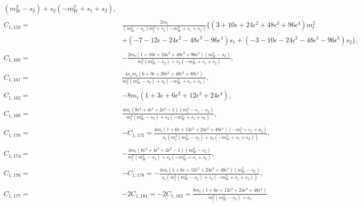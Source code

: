 \documentclass[twocolumn,aps,showpacs,nofootinbib,superscriptaddress,prd]{revtex4-2}
\begin{document}
\begin{widetext}
\begin{align}
{\left(m_W^2-s_2\right)+s_2\left(-m_W^2+s_1+s_2\right)}
,\nonumber\\
\nonumber\\
C_{1,159}=&\frac{2m_t}{\left(m_W^2-s_2\right)m_t^2+s_2\left(-m_W^2+s_1+s_2\right)}\{\left(3 +10 \epsilon +24 \epsilon^2 +48 \epsilon^3 +96 \epsilon^4\right)m_t^2
\nonumber\\&
+\left(-7 -12 \epsilon -24 \epsilon^2 -48 \epsilon^3 -96 \epsilon^4\right)s_1+\left(-3 -10 \epsilon -24 \epsilon^2 -48 \epsilon^3 -96 \epsilon^4\right)s_2\}
,\nonumber\\
\nonumber\\
C_{1,160}=&-\frac{2m_t\left(1 +10 \epsilon +24 \epsilon^2 +48 \epsilon^3 +96 \epsilon^4\right)\left(m_W^2-s_2\right)}{m_t^2
\left(m_W^2-s_2\right)+s_2\left(-m_W^2+s_1+s_2\right)}
,\nonumber\\
\nonumber\\
C_{1,161}=&\frac{4s_1m_t\left(6 +9 \epsilon +20 \epsilon^2 +40 \epsilon^3 +80 \epsilon^4\right)}{m_t^2\left(m_W^2-s_2\right)+s_2
\left(-m_W^2+s_1+s_2\right)}
,\nonumber\\
\nonumber\\
C_{1,162}=&-8m_t\left(1 +3 \epsilon +6 \epsilon^2 +12 \epsilon^3 +24 \epsilon^4\right)
,\nonumber\\
\nonumber\\
C_{1,169}=&\frac{4m_t\left(8\epsilon^4+4\epsilon^3+2\epsilon^2-1\right)\left(m_t^2-s_1-s_2\right)}{m_t^2\left(m_W^2-s_2\right)+s_2
\left(-m_W^2+s_1+s_2\right)}
,\nonumber\\
\nonumber\\
C_{1,170}=&-C_{1,175}=\frac{4m_t\left(1 +6 \epsilon +12 \epsilon^2 +24 \epsilon^3 +48 \epsilon^4\right)\left(-m_t^2+s_1+s_2\right)}{s_1\left(m_t^2
\left(m_W^2-s_2\right)+s_2\left(-m_W^2+s_1+s_2\right)\right)}
,\nonumber\\
\nonumber\\
C_{1,174}=&-\frac{4m_t\left(8\epsilon^4+4\epsilon^3+2\epsilon^2-1\right)\left(m_W^2-s_2\right)}{m_t^2\left(m_W^2-s_2\right)+s_2
\left(-m_W^2+s_1+s_2\right)}
,\nonumber\\
\nonumber\\
C_{1,176}=&-C_{1,178}=-\frac{4m_t\left(1 +6 \epsilon +12 \epsilon^2 +24 \epsilon^3 +48 \epsilon^4\right)\left(m_W^2-s_2\right)}{s_1\left(m_t^2
\left(m_W^2-s_2\right)+s_2\left(-m_W^2+s_1+s_2\right)\right)}
,\nonumber\\
\nonumber\\
C_{1,177}=&-2C_{1,181}=-2C_{1,182}=\frac{8m_t\left(1 +6 \epsilon +12 \epsilon^2 +24 \epsilon^3 +48 \epsilon^4\right)}{m_t^2\left(m_W^2-s_2\right)+s_2
}
\end{align}
\end{widetext}
\end{document}
